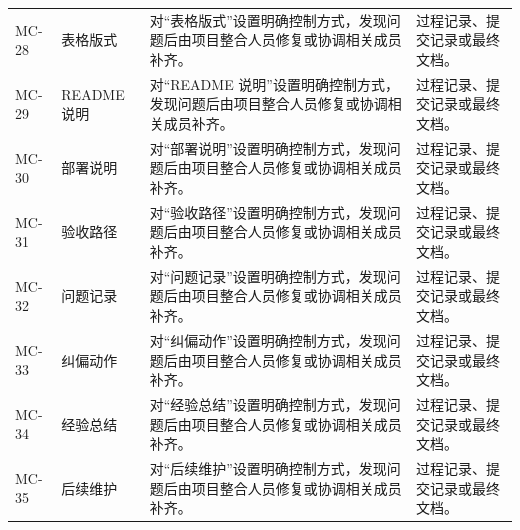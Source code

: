 \documentclass[12pt,a4paper]{ctexart}
\begin{document}
\begin{longtable}{L{1.8cm}L{3.2cm}L{6.4cm}L{4.0cm}}
MC-28 & 表格版式 & 对“表格版式”设置明确控制方式，发现问题后由项目整合人员修复或协调相关成员补齐。 & 过程记录、提交记录或最终文档。 \\
MC-29 & README 说明 & 对“README 说明”设置明确控制方式，发现问题后由项目整合人员修复或协调相关成员补齐。 & 过程记录、提交记录或最终文档。 \\
MC-30 & 部署说明 & 对“部署说明”设置明确控制方式，发现问题后由项目整合人员修复或协调相关成员补齐。 & 过程记录、提交记录或最终文档。 \\
MC-31 & 验收路径 & 对“验收路径”设置明确控制方式，发现问题后由项目整合人员修复或协调相关成员补齐。 & 过程记录、提交记录或最终文档。 \\
MC-32 & 问题记录 & 对“问题记录”设置明确控制方式，发现问题后由项目整合人员修复或协调相关成员补齐。 & 过程记录、提交记录或最终文档。 \\
MC-33 & 纠偏动作 & 对“纠偏动作”设置明确控制方式，发现问题后由项目整合人员修复或协调相关成员补齐。 & 过程记录、提交记录或最终文档。 \\
MC-34 & 经验总结 & 对“经验总结”设置明确控制方式，发现问题后由项目整合人员修复或协调相关成员补齐。 & 过程记录、提交记录或最终文档。 \\
MC-35 & 后续维护 & 对“后续维护”设置明确控制方式，发现问题后由项目整合人员修复或协调相关成员补齐。 & 过程记录、提交记录或最终文档。 \\
\bottomrule
\end{longtable}
\end{document}
